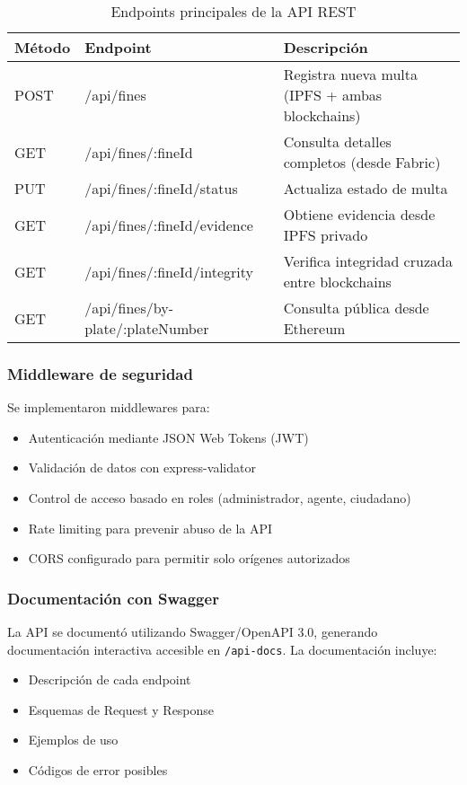 \begin{table}[h]
\centering
\begin{tabular}{|l|l|p{6cm}|}
\hline
\textbf{Método} & \textbf{Endpoint} & \textbf{Descripción} \\ \hline
POST & /api/fines & Registra nueva multa (IPFS + ambas blockchains) \\ \hline
GET & /api/fines/:fineId & Consulta detalles completos (desde Fabric) \\ \hline
PUT & /api/fines/:fineId/status & Actualiza estado de multa \\ \hline
GET & /api/fines/:fineId/evidence & Obtiene evidencia desde IPFS privado \\ \hline
GET & /api/fines/:fineId/integrity & Verifica integridad cruzada entre blockchains \\ \hline
GET & /api/fines/by-plate/:plateNumber & Consulta pública desde Ethereum \\ \hline
\end{tabular}
\caption{Endpoints principales de la API REST}
\end{table}

\subsubsection{Middleware de seguridad}

Se implementaron middlewares para:
\begin{itemize}
    \item Autenticación mediante JSON Web Tokens (JWT)
    \item Validación de datos con express-validator
    \item Control de acceso basado en roles (administrador, agente, ciudadano)
    \item Rate limiting para prevenir abuso de la API
    \item CORS configurado para permitir solo orígenes autorizados
\end{itemize}

\subsubsection{Documentación con Swagger}

La API se documentó utilizando Swagger/OpenAPI 3.0, generando documentación interactiva accesible en \texttt{/api-docs}. La documentación incluye:
\begin{itemize}
    \item Descripción de cada endpoint
    \item Esquemas de Request y Response
    \item Ejemplos de uso
    \item Códigos de error posibles
\end{itemize}

